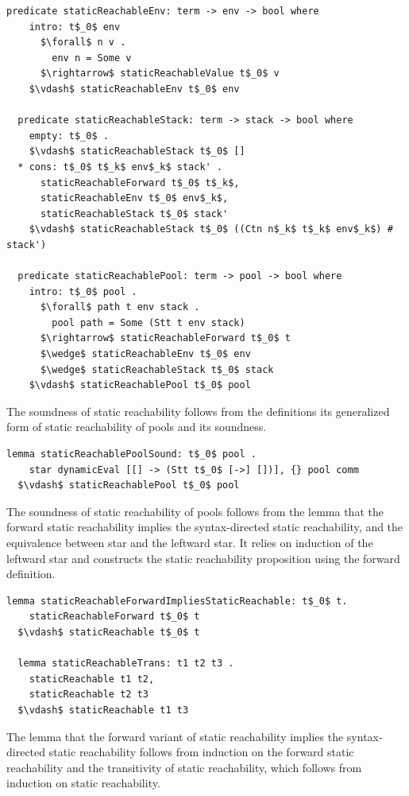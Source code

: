 \documentclass[letterpaper, 11pt]{report}
\begin{document}
\begin{lstlisting}[language=logic, mathescape]
  predicate staticReachableEnv: term -> env -> bool where
    intro: t$_0$ env
      $\forall$ n v . 
        env n = Some v
      $\rightarrow$ staticReachableValue t$_0$ v
    $\vdash$ staticReachableEnv t$_0$ env

  predicate staticReachableStack: term -> stack -> bool where
    empty: t$_0$ .
    $\vdash$ staticReachableStack t$_0$ []
  * cons: t$_0$ t$_k$ env$_k$ stack' .
      staticReachableForward t$_0$ t$_k$, 
      staticReachableEnv t$_0$ env$_k$,
      staticReachableStack t$_0$ stack' 
    $\vdash$ staticReachableStack t$_0$ ((Ctn n$_k$ t$_k$ env$_k$) # stack')

  predicate staticReachablePool: term -> pool -> bool where
    intro: t$_0$ pool .
      $\forall$ path t env stack .
        pool path = Some (Stt t env stack) 
      $\rightarrow$ staticReachableForward t$_0$ t
      $\wedge$ staticReachableEnv t$_0$ env
      $\wedge$ staticReachableStack t$_0$ stack
    $\vdash$ staticReachablePool t$_0$ pool

\end{lstlisting}

The soundness of static reachability follows from the definitions
its generalized form of static reachability of pools and its soundness.

\begin{lstlisting}[language=logic, mathescape]
  lemma staticReachablePoolSound: t$_0$ pool .
    star dynamicEval [[] -> (Stt t$_0$ [->] [])], {} pool comm 
  $\vdash$ staticReachablePool t$_0$ pool
\end{lstlisting}

The soundness of static reachability of pools follows from the lemma that the forward
static reachability implies the syntax-directed static reachability,
and the equivalence between star and the leftward star. It relies on induction of the
leftward star and constructs the static reachability proposition using the forward definition. 

\begin{lstlisting}[language=logic, mathescape]
  lemma staticReachableForwardImpliesStaticReachable: t$_0$ t. 
    staticReachableForward t$_0$ t
  $\vdash$ staticReachable t$_0$ t

  lemma staticReachableTrans: t1 t2 t3 .
    staticReachable t1 t2,
    staticReachable t2 t3
  $\vdash$ staticReachable t1 t3
\end{lstlisting}

The lemma that the forward variant of static reachability implies the syntax-directed static
reachability follows from induction on the forward static reachability and the
transitivity of static reachability, which follows from induction on static reachability.
\end{document}
